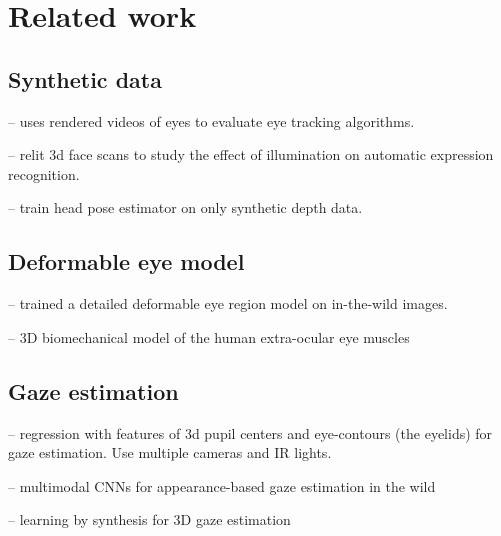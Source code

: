 
\section{Related work}

\subsection{Synthetic data}

\cite{swirski2014rendering} -- uses rendered videos of eyes to evaluate eye tracking algorithms.

\cite{stratou2011effect} -- relit 3d face scans to study the effect of illumination on automatic expression recognition.

\cite{fanelli2011real} -- train head pose estimator on only synthetic depth data.

\subsection{Deformable eye model}

\cite{alabort2014statistically} -- trained a detailed deformable eye region model on in-the-wild images.

\cite{priamikov14_openeyesim} -- 3D biomechanical model of the human extra-ocular eye muscles

\subsection{Gaze estimation}

\cite{xiong2014gaze} -- regression with features of 3d pupil centers and eye-contours (the eyelids) for gaze estimation.  Use multiple cameras and IR lights.

\cite{zhang15_cvpr} -- multimodal CNNs for appearance-based gaze estimation in the wild

\cite{sugano2014learning} -- learning by synthesis for 3D gaze estimation